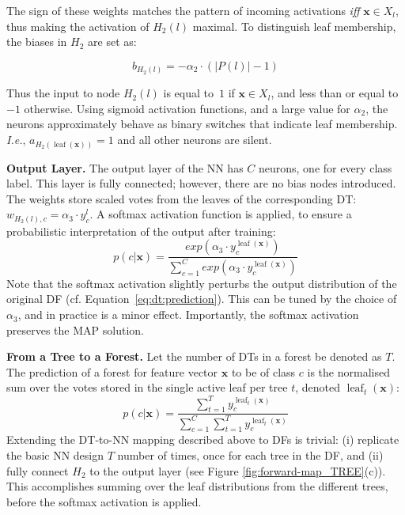 \documentclass[twocolumn]{svjour3}
\DeclareMathOperator{\leaf}{leaf}
\begin{document}
\vspace{-6pt}
\noindent The sign of these weights matches the pattern of incoming activations \emph{iff} $\textbf{x} \in X_l$, thus making the activation of $H_2(l)$ maximal.
%
To distinguish leaf membership, the biases in $H_2$ are set as:
\vspace{-6pt}

{
\small
\begin{equation}
b_{H_2(l)} = -\alpha_2 \cdot ( |P(l)| - 1) 
\end{equation}
}

\vspace{-6pt}
\noindent Thus the input to node $H_2(l)$ is equal to~$1$ if $\mathbf{x} \in X_l$, and less than or equal to $-1$ otherwise. 
Using sigmoid activation functions, and a large value for $\alpha_2$, the neurons approximately behave as binary switches that indicate leaf membership. \emph{I.e.}, $a_{H_2(\leaf(\mathbf{x}))} = 1$ and all other neurons are silent.

\textbf{Output Layer. } The output layer of the NN has $C$ neurons, one for every class label.  This layer is fully connected; however, there are no bias nodes introduced. The weights store scaled votes from the leaves of the corresponding DT: $w_{H_2(l),c} = \alpha_3 \cdot y^l_c$. A softmax activation function is applied, to ensure a probabilistic interpretation of the output after training:
%
\begin{equation}
p(c | \mathbf{x}) = \frac{exp(\alpha_3 \cdot y^{\leaf(\mathbf{x})}_c)}{\sum_{c=1}^{C} exp(\alpha_3 \cdot y^{\leaf(\mathbf{x})}_c)}
\end{equation} 
%
Note that the softmax activation slightly perturbs the output distribution of the original DF (cf. Equation~\ref{eq:dt:prediction}).
This can be tuned by the choice of $\alpha_3$, and in practice is a minor effect.
Importantly, the softmax activation preserves the MAP solution.

\textbf{From a Tree to a Forest. } 
Let the number of DTs in a forest be denoted as $T$. 
The prediction of a forest for feature vector $\mathbf{x}$ to be of class $c$ is the normalised sum over the votes stored in the single active leaf per tree $t$, denoted $\leaf_t(\mathbf{x})$:
%
\begin{equation}
p(c | \mathbf{x}) = \frac{\sum_{t=1}^{T} y^{\leaf_t(\mathbf{x})}_c}{\sum_{c=1}^{C}\sum_{t=1}^{T} y^{\leaf_t(\mathbf{x})}_c}
\label{eq:rf:prediction}
\end{equation} 
% 
Extending the DT-to-NN mapping described above to DFs is trivial: (i) replicate the basic NN design $T$ number of times, once for each tree in the DF, and (ii) fully connect $H_2$ to the output layer
(see Figure \ref{fig:forward-map_TREE}(c)).
This accomplishes summing over the leaf distributions from the different trees, before the softmax activation is applied.
\end{document}
